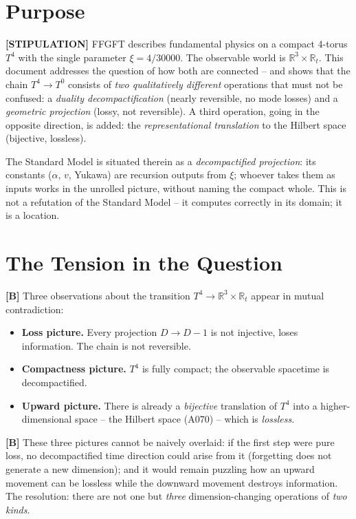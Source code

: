 \section{Purpose}

\textbf{[STIPULATION]} FFGFT describes fundamental physics on a compact 4-torus
$T^4$ with the single parameter $\xi=4/30000$. The observable world is
$\mathbb{R}^3\times\mathbb{R}_t$. This document addresses the question of how
both are connected -- and shows that the chain $T^4\to T^0$ consists of
\emph{two qualitatively different} operations that must not be confused: a
\emph{duality decompactification} (nearly reversible, no mode losses) and a
\emph{geometric projection} (lossy, not reversible). A third operation, going in
the opposite direction, is added: the \emph{representational translation} to the
Hilbert space (bijective, lossless).

The Standard Model is situated therein as a \emph{decompactified projection}:
its constants ($\alpha$, $v$, Yukawa) are recursion outputs from $\xi$; whoever
takes them as inputs works in the unrolled picture, without naming the compact
whole. This is not a refutation of the Standard Model -- it computes correctly
in its domain; it is a location.

\section{The Tension in the Question}

\textbf{[B]} Three observations about the transition $T^4\to\mathbb{R}^3\times\mathbb{R}_t$
appear in mutual contradiction:

\begin{itemize}[leftmargin=2em,itemsep=3pt,topsep=3pt]
  \item \textbf{Loss picture.} Every projection $D\to D-1$ is not injective,
    loses information. The chain is not reversible.
  \item \textbf{Compactness picture.} $T^4$ is fully compact; the observable
    spacetime is decompactified.
  \item \textbf{Upward picture.} There is already a \emph{bijective} translation
    of $T^4$ into a higher-dimensional space -- the Hilbert space (A070) --
    which is \emph{lossless}.
\end{itemize}

\textbf{[B]} These three pictures cannot be naively overlaid: if the first step
were pure loss, no decompactified time direction could arise from it (forgetting
does not generate a new dimension); and it would remain puzzling how an upward
movement can be lossless while the downward movement destroys information. The
resolution: there are not one but \emph{three} dimension-changing operations of
\emph{two kinds}.

